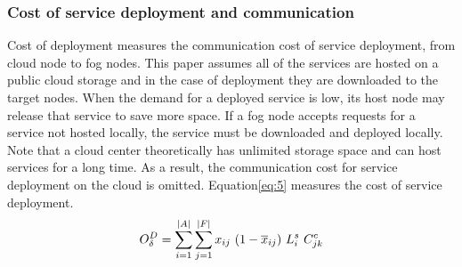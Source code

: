 \documentclass[twocolumn]{article}
\begin{document}
\subsubsection{Cost of service deployment and communication}
\par Cost of deployment measures the communication cost of service deployment, from cloud node to fog nodes. This paper assumes all of the services are hosted on a public cloud storage and in the case of deployment they are downloaded to the target nodes. When the demand for a deployed service is low, its host node may release that service to save more space. If a fog node accepts requests for a service not hosted locally, the service must be downloaded and deployed locally. Note that a cloud center theoretically has unlimited storage space and can host services for a long time. As a result, the communication cost for service deployment on the cloud is omitted. Equation\ref{eq:5} measures the cost of service deployment.
\begin{equation}
O_{\delta}^{D} = 
\sum_{i=1}^{|A|}\sum_{j=1}^{|{F}|}x_{ij} \ (1-\overline{x}_{ij})\ L_{i}^{s} \ C_{jk}^{c} 
\label{eq:5}\\
\end{equation}
\end{document}
